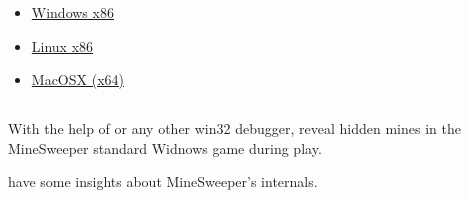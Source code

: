 \begin{itemize}
\item
\href{http://yurichev.com/RE-exercises/3/6/webserv_win32.rar}{Windows x86}

\item
\href{http://yurichev.com/RE-exercises/3/6/webserv_Linux_x86.tar}{Linux x86}

\item
\href{http://yurichev.com/RE-exercises/3/6/webserv_MacOSX_x64.tar}{MacOSX (x64)}
\end{itemize}

\subsection{}

{With the help of \tracer or any other win32 debugger, reveal hidden mines in the MineSweeper standard Widnows game
during play}.

 \cite{trew} 
{have some insights about MineSweeper's internals}.
